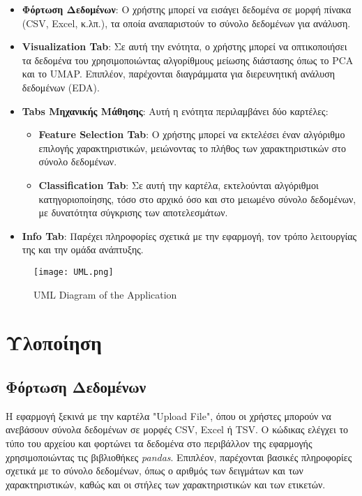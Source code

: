 \documentclass[a4paper,12pt]{article}
\begin{document}
\begin{itemize}
    \item \textbf{Φόρτωση Δεδομένων}: Ο χρήστης μπορεί να εισάγει δεδομένα σε μορφή πίνακα (CSV, Excel, κ.λπ.), τα οποία αναπαριστούν το σύνολο δεδομένων για ανάλυση.
    \item \textbf{Visualization Tab}: Σε αυτή την ενότητα, ο χρήστης μπορεί να οπτικοποιήσει τα δεδομένα του χρησιμοποιώντας αλγορίθμους μείωσης διάστασης όπως το PCA και το UMAP. Επιπλέον, παρέχονται διαγράμματα για διερευνητική ανάλυση δεδομένων (EDA).
    \item \textbf{Tabs Μηχανικής Μάθησης}: Αυτή η ενότητα περιλαμβάνει δύο καρτέλες:
        \begin{itemize}
            \item \textbf{Feature Selection Tab}: Ο χρήστης μπορεί να εκτελέσει έναν αλγόριθμο επιλογής χαρακτηριστικών, μειώνοντας το πλήθος των χαρακτηριστικών στο σύνολο δεδομένων.
            \item \textbf{Classification Tab}: Σε αυτή την καρτέλα, εκτελούνται αλγόριθμοι κατηγοριοποίησης, τόσο στο αρχικό όσο και στο μειωμένο σύνολο δεδομένων, με δυνατότητα σύγκρισης των αποτελεσμάτων.
        \end{itemize}
    \item \textbf{Info Tab}: Παρέχει πληροφορίες σχετικά με την εφαρμογή, τον τρόπο λειτουργίας της και την ομάδα ανάπτυξης.
\end{itemize}
\begin{figure}[ht!]
    \centering
    \texttt{[image: UML.png]}
    \caption{UML Diagram of the Application}
    \label{fig:uml-diagram}
\end{figure}
\section{Υλοποίηση}
\subsection{Φόρτωση Δεδομένων}
Η εφαρμογή ξεκινά με την καρτέλα "Upload File", όπου οι χρήστες μπορούν να ανεβάσουν σύνολα δεδομένων σε μορφές CSV, Excel ή TSV. Ο κώδικας ελέγχει το τύπο του αρχείου και φορτώνει τα δεδομένα στο περιβάλλον της εφαρμογής χρησιμοποιώντας τις βιβλιοθήκες \textit{pandas}. Επιπλέον, παρέχονται βασικές πληροφορίες σχετικά με το σύνολο δεδομένων, όπως ο αριθμός των δειγμάτων και των χαρακτηριστικών, καθώς και οι στήλες των χαρακτηριστικών και των ετικετών.
\end{document}

